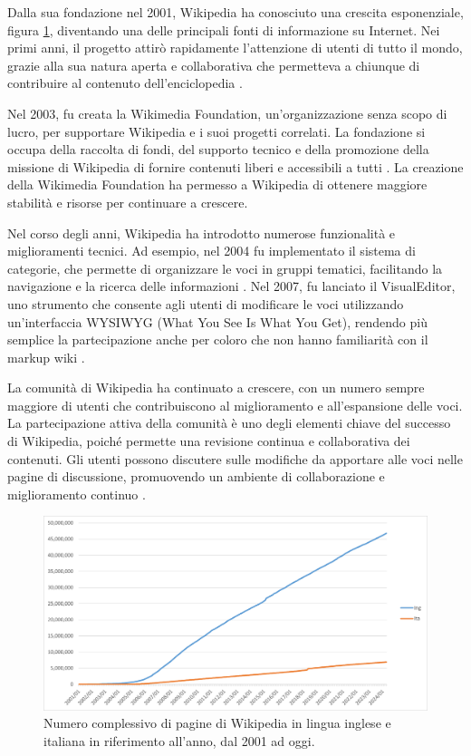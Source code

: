 \documentclass[12pt,a4paper]{report}
\begin{document}
Dalla sua fondazione nel 2001, Wikipedia ha conosciuto una crescita esponenziale, figura \cref{fig:wikiPagesYear}, diventando una delle principali fonti di informazione su Internet. Nei primi anni, il progetto attirò rapidamente l'attenzione di utenti di tutto il mondo, grazie alla sua natura aperta e collaborativa che permetteva a chiunque di contribuire al contenuto dell'enciclopedia \cite{lih2009wikipedia}.

Nel 2003, fu creata la Wikimedia Foundation, un'organizzazione senza scopo di lucro, per supportare Wikipedia e i suoi progetti correlati. La fondazione si occupa della raccolta di fondi, del supporto tecnico e della promozione della missione di Wikipedia di fornire contenuti liberi e accessibili a tutti \cite{reagle2010good}. La creazione della Wikimedia Foundation ha permesso a Wikipedia di ottenere maggiore stabilità e risorse per continuare a crescere.

Nel corso degli anni, Wikipedia ha introdotto numerose funzionalità e miglioramenti tecnici. Ad esempio, nel 2004 fu implementato il sistema di categorie, che permette di organizzare le voci in gruppi tematici, facilitando la navigazione e la ricerca delle informazioni \cite{jemielniak2014wikipedia}. Nel 2007, fu lanciato il VisualEditor, uno strumento che consente agli utenti di modificare le voci utilizzando un'interfaccia WYSIWYG (What You See Is What You Get), rendendo più semplice la partecipazione anche per coloro che non hanno familiarità con il markup wiki \cite{history_of_wikis}.

La comunità di Wikipedia ha continuato a crescere, con un numero sempre maggiore di utenti che contribuiscono al miglioramento e all'espansione delle voci. La partecipazione attiva della comunità è uno degli elementi chiave del successo di Wikipedia, poiché permette una revisione continua e collaborativa dei contenuti. Gli utenti possono discutere sulle modifiche da apportare alle voci nelle pagine di discussione, promuovendo un ambiente di collaborazione e miglioramento continuo \cite{denning2005wikipedia}.

\begin{figure}
    \includegraphics[width=\linewidth]{Immagini/Grafico pagine wikipedia excel.png}
    \caption{Numero complessivo di pagine di Wikipedia in lingua inglese e italiana in riferimento all'anno, dal 2001 ad oggi.\cite{wikimedia_stats} }
    \captionsetup{width=.8\linewidth}
    \label{fig:wikiPagesYear}
\end{figure}
\end{document}
